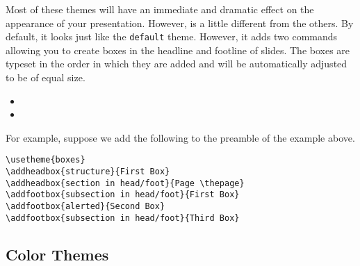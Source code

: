 \normalfont
Most of these themes will have an immediate and dramatic effect on the appearance of your presentation.
However,  is a little different from the others.
By default, it looks just like the \texttt{default} theme.
However, it adds two commands allowing you to create boxes in the headline and footline of slides.
The boxes are typeset in the order in which they are added and will be automatically adjusted to be of equal size.
\begin{itemize}
  \item {}
  \item {}
\end{itemize}
For example, suppose we add the following to the preamble of the example above.
\begin{verbatim}
\usetheme{boxes}
\addheadbox{structure}{First Box}
\addheadbox{section in head/foot}{Page \thepage}
\addfootbox{subsection in head/foot}{First Box}
\addfootbox{alerted}{Second Box}
\addfootbox{subsection in head/foot}{Third Box}
\end{verbatim}
\begin{center}
  \par
\end{center}


\subsection{Color Themes}\label{subsec:color-themes}

